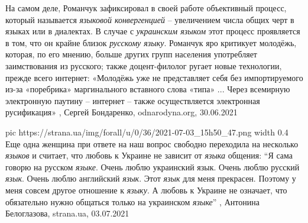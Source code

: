 На самом деле, Романчук зафиксировал в своей работе объективный процесс,
который называется \emph{языковой конвергенцией} – увеличением числа общих черт в
языках или в диалектах. В случае с \emph{украинским языком} этот процесс проявляется в
том, что он крайне близок \emph{русскому языку}. Романчук яро критикует молодёжь,
которая, по его мнению, больше других групп населения употребляет заимствования
из русского; также доцент-филолог ругает новые технологии, прежде всего
интернет: «Молодёжь уже не представляет себя без импортируемого из-за
«поребрика» маргинального вставного слова «типа» ... Через всемирную
электронную паутину – интернет – также осуществляется электронная русификация»
, 
Сергей Бондаренко, odnarodyna.org, 30.06.2021

\ifcmt
  pic https://strana.ua/img/forall/u/0/36/2021-07-03_15h50_47.png
	width 0.4
\fi
Еще одна женщина при ответе на наш вопрос свободно переходила на несколько
\emph{языков} и считает, что любовь к Украине не зависит от \emph{языка} общения:
\enquote{Я сама говорю на русском \emph{языке}. Очень люблю украинский язык. Очень люблю
русский \emph{язык}. Очень люблю английский \emph{язык}. Этот \emph{язык} для меня прекрасен.
Поэтому у меня совсем другое отношение к \emph{языку}. А любовь к Украине не означает,
что обязательно нужно общаться только на украинском \emph{языке}}
, 
Антонина Белоглазова, strana.ua, 03.07.2021
